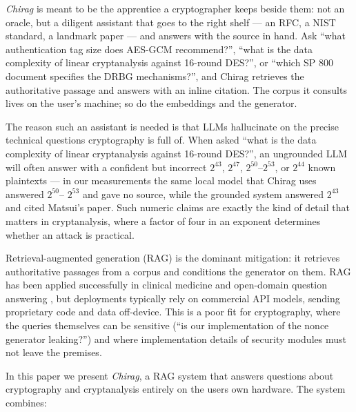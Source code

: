 \documentclass[version=submission]{iacrcc}
\begin{document}
\emph{Chirag} is meant to be the apprentice a cryptographer keeps beside
them: not an oracle, but a diligent assistant that goes to the right
shelf --- an RFC, a NIST standard, a landmark paper --- and answers with
the source in hand. Ask ``what authentication tag size does AES-GCM
recommend?'', ``what is the data complexity of linear cryptanalysis
against 16-round DES?'', or ``which SP 800 document specifies the DRBG
mechanisms?'', and Chirag retrieves the authoritative passage and answers
with an inline citation. The corpus it consults lives on the user's
machine; so do the embeddings and the generator.

The reason such an assistant is needed is that LLMs hallucinate on the
precise technical questions cryptography is full of. When asked
``what is the data complexity of linear cryptanalysis against 16-round
DES?'', an ungrounded LLM will often answer with a confident but incorrect
$2^{43}$, $2^{47}$, $2^{50}$--$2^{53}$, or $2^{44}$ known plaintexts --- in
our measurements the same local model that Chirag uses answered $2^{50}$--
$2^{53}$ and gave no source, while the grounded system answered $2^{43}$ and
cited Matsui's paper. Such numeric claims are exactly the kind of detail
that matters in cryptanalysis, where a factor of four in an exponent
determines whether an attack is practical.

Retrieval-augmented generation (RAG) \cite{lewis2020rag} is the dominant
mitigation: it retrieves authoritative passages from a corpus and conditions
the generator on them. RAG has been applied successfully in clinical medicine
\cite{zakka2024almanac} and open-domain question answering
\cite{karpukhin2020dpr}, but deployments typically
rely on commercial API models, sending proprietary code and data off-device.
This is a poor fit for cryptography, where the queries themselves can be
sensitive (``is our implementation of the nonce generator leaking?'') and
where implementation details of security modules must not leave the premises.

In this paper we present \emph{Chirag}, a RAG system that answers
questions about cryptography and cryptanalysis entirely on the users own
hardware. The system combines:
\end{document}
